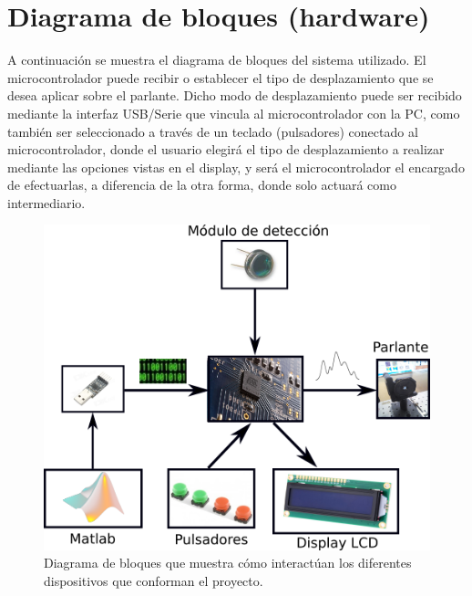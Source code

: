 \section{Diagrama de bloques (hardware)}
\label{sec:diag_bloq}
A continuación se muestra el diagrama de bloques del sistema utilizado. El microcontrolador puede recibir o establecer el tipo de desplazamiento que se desea aplicar sobre el parlante. Dicho modo de desplazamiento puede ser recibido mediante la interfaz USB/Serie que vincula al microcontrolador con la PC, como también ser seleccionado a través de un teclado (pulsadores) conectado al microcontrolador, donde el usuario elegirá el tipo de desplazamiento a realizar mediante las opciones vistas en el display, y será el microcontrolador el encargado de efectuarlas, a diferencia de la otra forma, donde solo actuará como intermediario.

\begin{figure}[H]
  \centering
  \includegraphics[width=1.0\textwidth]{images/diagrama_de_bloques.png}
  \caption{Diagrama de bloques que muestra cómo interactúan los diferentes dispositivos que conforman el proyecto.}
  \label{fig:Diagrama de bloques}
\end{figure}